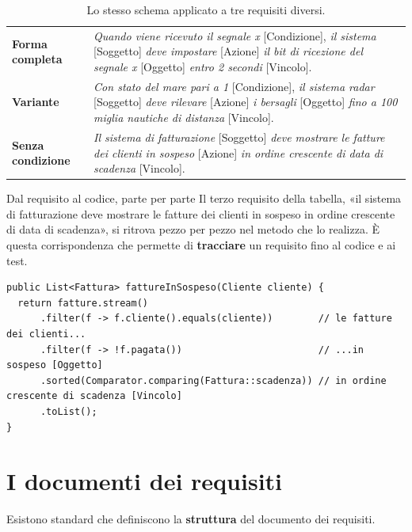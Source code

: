 \begin{table}[H]
\centering
\renewcommand{\arraystretch}{1.45}
\begin{tabularx}{\textwidth}{>{\bfseries}P{3.2cm} L}
\toprule
Forma completa & \textit{Quando viene ricevuto il segnale x} [Condizione], \textit{il sistema} [Soggetto] \textit{deve impostare}
[Azione] \textit{il bit di ricezione del segnale x} [Oggetto] \textit{entro 2 secondi} [Vincolo]. \\
Variante & \textit{Con stato del mare pari a 1} [Condizione], \textit{il sistema radar} [Soggetto] \textit{deve rilevare}
[Azione] \textit{i bersagli} [Oggetto] \textit{fino a 100 miglia nautiche di distanza} [Vincolo]. \\
Senza condizione & \textit{Il sistema di fatturazione} [Soggetto] \textit{deve mostrare le fatture dei clienti in sospeso}
[Azione] \textit{in ordine crescente di data di scadenza} [Vincolo]. \\
\bottomrule
\end{tabularx}
\caption{Lo stesso schema applicato a tre requisiti diversi.}
\end{table}

\begin{esempio}{Dal requisito al codice, parte per parte}
Il terzo requisito della tabella, «il sistema di fatturazione deve mostrare le fatture dei clienti in sospeso in ordine
crescente di data di scadenza», si ritrova pezzo per pezzo nel metodo che lo realizza. È questa corrispondenza che
permette di \textbf{tracciare} un requisito fino al codice e ai test.
\begin{lstlisting}[style=java, name=ServizioFatturazione.java]
public List<Fattura> fattureInSospeso(Cliente cliente) {
  return fatture.stream()
      .filter(f -> f.cliente().equals(cliente))        // le fatture dei clienti...
      .filter(f -> !f.pagata())                        // ...in sospeso [Oggetto]
      .sorted(Comparator.comparing(Fattura::scadenza)) // in ordine crescente di scadenza [Vincolo]
      .toList();
}
\end{lstlisting}
\end{esempio}

\section{I documenti dei requisiti}

Esistono standard che definiscono la \textbf{struttura} del documento dei requisiti.

